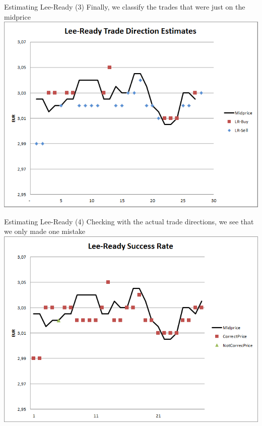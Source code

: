 \documentclass[english,10pt
,aspectratio=169
]{beamer}
\begin{document}
\begin{frame}{Estimating Lee-Ready (3)}
	Finally, we classify the trades that were just on the midprice
	\center
	\includegraphics[scale=0.39]{pics/L2_leereadyest}
\end{frame}


\begin{frame}{Estimating Lee-Ready (4)}
	Checking with the actual trade directions, we see that we only made one mistake
	\center
	\includegraphics[scale=0.39]{pics/L2_leereadysuccess}
\end{frame}
\end{document}
